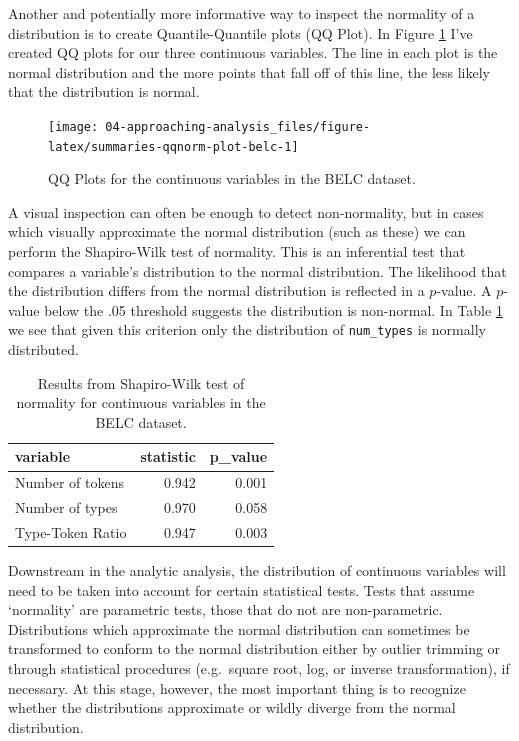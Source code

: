 \documentclass[
]{article}
\begin{document}
Another and potentially more informative way to inspect the normality of a distribution is to create Quantile-Quantile plots (QQ Plot). In Figure \ref{fig:summaries-qqnorm-plot-belc} I've created QQ plots for our three continuous variables. The line in each plot is the normal distribution and the more points that fall off of this line, the less likely that the distribution is normal.

\begin{figure}

{\centering \texttt{[image: 04-approaching-analysis\_files/figure-latex/summaries-qqnorm-plot-belc-1]} 

}

\caption{QQ Plots for the continuous variables in the BELC dataset.}\label{fig:summaries-qqnorm-plot-belc}
\end{figure}

A visual inspection can often be enough to detect non-normality, but in cases which visually approximate the normal distribution (such as these) we can perform the Shapiro-Wilk test of normality. This is an inferential test that compares a variable's distribution to the normal distribution. The likelihood that the distribution differs from the normal distribution is reflected in a \(p\)-value. A \(p\)-value below the .05 threshold suggests the distribution is non-normal. In Table \ref{tab:summaries-normality-test-belc} we see that given this criterion only the distribution of \texttt{num\_types} is normally distributed.

\begin{table}

\caption{\label{tab:summaries-normality-test-belc}Results from Shapiro-Wilk test of normality for continuous variables in the BELC dataset.}
\centering
\begin{tabular}[t]{lrr}
\toprule
variable & statistic & p\_value\\
\midrule
Number of tokens & 0.942 & 0.001\\
Number of types & 0.970 & 0.058\\
Type-Token Ratio & 0.947 & 0.003\\
\bottomrule
\end{tabular}
\end{table}

Downstream in the analytic analysis, the distribution of continuous variables will need to be taken into account for certain statistical tests. Tests that assume `normality' are parametric tests, those that do not are non-parametric. Distributions which approximate the normal distribution can sometimes be transformed to conform to the normal distribution either by outlier trimming or through statistical procedures (e.g.~square root, log, or inverse transformation), if necessary. At this stage, however, the most important thing is to recognize whether the distributions approximate or wildly diverge from the normal distribution.
\end{document}
